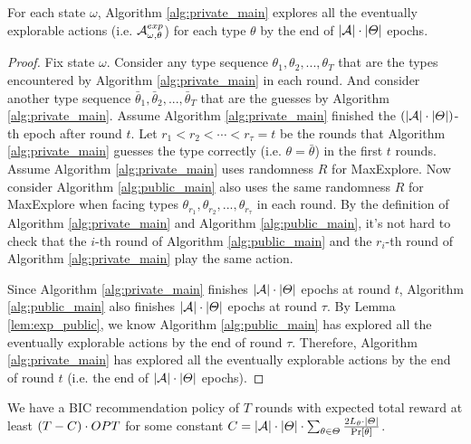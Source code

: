 \begin{lemma}
\label{lem:exp_private}
For each state $\omega$, Algorithm \ref{alg:private_main} explores all the eventually explorable actions (i.e. $\mathcal{A}_{\omega,\theta}^{exp}$) for each type $\theta$ by the end of $|\mathcal{A}|\cdot |\varTheta|$ epochs. 
\end{lemma}

\begin{proof}
Fix state $\omega$. Consider any type sequence $\theta_1, \theta_2, ..., \theta_T$ that are the types encountered by Algorithm \ref{alg:private_main} in each round. And consider another type sequence $\bar{\theta}_1,\bar{\theta}_2, ...,\bar{\theta}_T$ that are the guesses by Algorithm \ref{alg:private_main}. Assume Algorithm \ref{alg:private_main} finished the $(|\mathcal{A}|\cdot |\varTheta|)$-th epoch after round $t$. Let $r_1<r_2 < \cdots < r_{\tau} = t$ be the rounds that Algorithm \ref{alg:private_main} guesses the type correctly (i.e. $\theta = \bar{\theta}$) in the first $t$ rounds. Assume Algorithm \ref{alg:private_main} uses randomness $R$ for MaxExplore. Now consider Algorithm \ref{alg:public_main} also uses the same randomness $R$ for MaxExplore when facing types $\theta_{r_1},\theta_{r_2},...,\theta_{r_{\tau}}$ in each round. By the definition of Algorithm \ref{alg:private_main} and Algorithm \ref{alg:public_main}, it's not hard to check that the $i$-th round of Algorithm \ref{alg:public_main} and the $r_i$-th round of Algorithm \ref{alg:private_main} play the same action. 

Since Algorithm \ref{alg:private_main} finishes $|\mathcal{A}|\cdot |\varTheta|$ epochs at round $t$, Algorithm \ref{alg:public_main} also finishes $|\mathcal{A}|\cdot |\varTheta|$ epochs at round $\tau$. By Lemma \ref{lem:exp_public}, we know Algorithm \ref{alg:public_main} has explored all the eventually explorable actions by the end of round $\tau$. Therefore,  Algorithm \ref{alg:private_main} has explored all the eventually explorable actions by the end of round $t$ (i.e. the end of $|\mathcal{A}|\cdot |\varTheta|$ epochs).
\end{proof}

\begin{theorem}
\label{thm:private}
We have a BIC recommendation policy of $T$ rounds with expected total reward at least $\left(T - C \right) \cdot OPT$ for some constant $C = |\mathcal{A}| \cdot |\varTheta| \cdot \sum_{\theta\in\varTheta} \frac{2L_{\theta}\cdot |\varTheta|}{\Pr[\theta]}$. 
\end{theorem}

